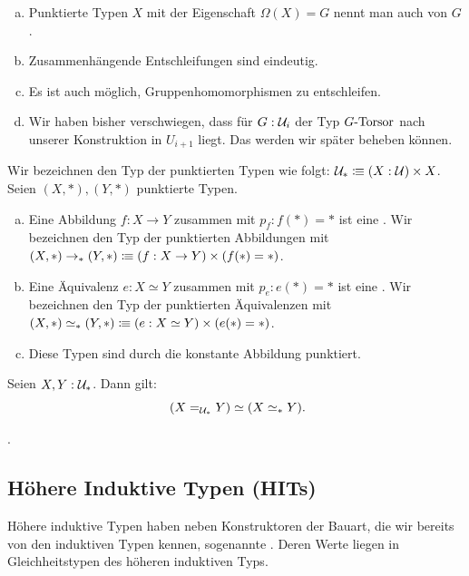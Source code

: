\begin{bemerkung}
  \begin{enumerate}[(a)]
  \item Punktierte Typen $X$ mit der Eigenschaft $\Omega(X)=G$ nennt man auch  von $G$.
  \item Zusammenhängende Entschleifungen sind eindeutig.
  \item Es ist auch möglich, Gruppenhomomorphismen zu entschleifen.
  \item Wir haben bisher verschwiegen, dass für $G:\mathcal{U}_i$ der Typ $G\mbox{-}\mathrm{Torsor}$ nach unserer Konstruktion in $U_{i+1}$ liegt. Das werden wir später beheben können.
  \end{enumerate}
\end{bemerkung}

\begin{definition}
  Wir bezeichnen den Typ der punktierten Typen wie folgt: $\mathcal{U}_\ast\vcentcolon\mspace{-1.2mu}\equiv (X:\mathcal{U})\times X$.
  Seien $(X,\ast),(Y,\ast)$ punktierte Typen.
  \begin{enumerate}[(a)]
  \item Eine Abbildung $f:X\to Y$ zusammen mit $p_f:f(\ast)=\ast$ ist eine . Wir bezeichnen den Typ der punktierten Abbildungen mit $(X,\ast)\to_\ast (Y,\ast)\vcentcolon\mspace{-1.2mu}\equiv (f:X\to Y)\times (f(\ast)=\ast)$\index{$\to_\ast$}.
  \item Eine Äquivalenz $e:X\simeq Y$ zusammen mit $p_e:e(\ast)=\ast$ ist eine .
    Wir bezeichnen den Typ der punktierten Äquivalenzen mit $(X,\ast)\simeq_\ast (Y,\ast)\vcentcolon\mspace{-1.2mu}\equiv (e:X\simeq Y)\times (e(\ast)=\ast)$\index{$\simeq_\ast$}.
  \item Diese Typen sind durch die konstante Abbildung punktiert.
  \end{enumerate}
\end{definition}

\begin{bemerkung}
  Seien $X,Y:\mathcal{U}_\ast$. Dann gilt:
  \[
    (X=_{\mU_\ast}Y)\simeq (X\simeq_\ast Y)\rlap{.}
  \]
\end{bemerkung}

\begin{beweis}
  .
\end{beweis}


\subsection{Höhere Induktive Typen (HITs)}
Höhere induktive Typen haben neben Konstruktoren der Bauart, die wir bereits von den induktiven Typen kennen, sogenannte .
Deren Werte liegen in Gleichheitstypen des höheren induktiven Typs.

